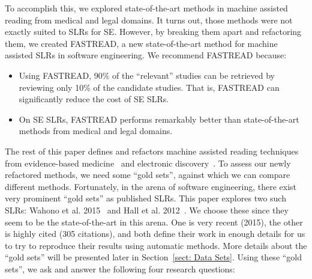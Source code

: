 \documentclass[final,twocolumn,5p]{elsarticle}
\theoremstyle{break}
\begin{document}
%
To accomplish this, we explored
state-of-the-art methods in machine assisted reading from  medical and legal domains.
It turns out, those methods were not exactly suited to SLRs for SE.
However, by breaking them apart and refactoring them, we created FASTREAD,
a new state-of-the-art method for machine assisted SLRs in software engineering.
We recommend FASTREAD because:
\begin{itemize}

  \item Using FASTREAD, 90\% of the ``relevant'' studies can
  be retrieved by reviewing only 10\% of the candidate studies. That is,
  FASTREAD can significantly reduce the cost of SE SLRs.
  \item On SE SLRs, FASTREAD performs remarkably better than state-of-the-art
  methods from medical and legal domains.
\end{itemize}
The rest of this paper defines and refactors machine assisted reading techniques
from evidence-based medicine~\cite{wallace2010semi,wallace2010active} and
electronic discovery~\cite{cormack2014evaluation,cormack2015autonomy}.
To assess our newly refactored methods,
we need some ``gold sets'',
against which we can compare different methods. Fortunately, in the arena of software
engineering, there exist very prominent ``gold sets'' as published SLRs. This paper explores two such SLRs: Wahono et al. 2015~\cite{wahono2015systematic} and Hall et
al. 2012~\cite{hall2012systematic}.  We choose these since they seem to be the
state-of-the-art in this arena. One is very recent (2015), the other is highly
cited (305 citations), and both define their work in enough details for us to try to
reproduce their results using automatic methods. More details about the ``gold
sets'' will be presented later in Section~\ref{sect: Data Sets}. Using
these ``gold sets'', we ask and answer the following four research questions:
\end{document}
